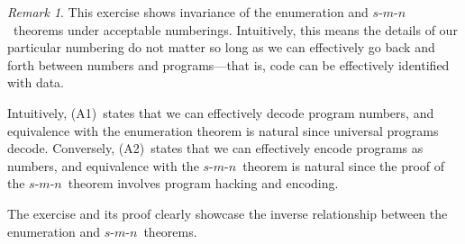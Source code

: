 \documentclass[letterpaper]{article}
\newcommand{\smn}{$s$-$m$-$n$}
\theoremstyle{definition}
\theoremstyle{remark}
\newtheorem*{rmk}{Remark}
\theoremstyle{direction}
\begin{document}
\begin{rmk}
This exercise shows invariance of the enumeration and \smn\ theorems under acceptable numberings. Intuitively, this means the details of our particular numbering do not matter so long as we can effectively go back and forth between numbers and programs---that is, code can be effectively identified with data.

Intuitively, (A1)~states that we can effectively decode program numbers, and equivalence with the enumeration theorem is natural since universal programs decode. Conversely, (A2)~states that we can effectively encode programs as numbers, and equivalence with the \smn\ theorem is natural since the proof of the \smn\ theorem involves program hacking and encoding.

The exercise and its proof clearly showcase the inverse relationship between the enumeration and \smn\ theorems.
\end{rmk}
\end{document}
